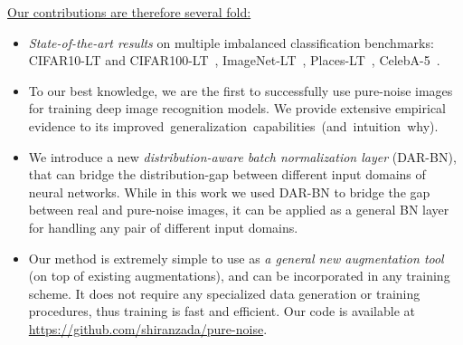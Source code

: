 \documentclass[nohyperref]{article}
\theoremstyle{plain}
\theoremstyle{definition}
\theoremstyle{remark}
\begin{document}
\noindent \underline{Our contributions are therefore several fold:}
\vspace{-0.1cm}
\begin{itemize}[topsep=0pt,itemsep=-1ex,partopsep=1ex,parsep=1ex,leftmargin=*]
\item \emph{State-of-the-art results} on multiple imbalanced classification benchmarks: CIFAR10-LT and CIFAR100-LT~\cite{cao2019learning}, ImageNet-LT~\cite{liu2019large}, Places-LT~\cite{liu2019large}, CelebA-5~\cite{kim2020m2m}.
\item To our best knowledge, we are the first to successfully use pure-noise images for training deep image recognition models. We provide extensive empirical evidence to its \mbox{improved generalization capabilities (and intuition why).}
\item We introduce a new \emph{distribution-aware batch normalization layer} (DAR-BN), that can bridge the distribution-gap between different input domains of neural networks. While in this work we used DAR-BN to bridge the gap between real and pure-noise images, it can be applied as a general BN layer for handling any pair of different input domains.
\item Our method is extremely simple to use as \emph{a general new augmentation tool} (on top of existing augmentations), and can be incorporated in any training scheme. It does not require any specialized data generation or training procedures, thus training is fast and efficient. 
Our code  is available at \hyperlink{https://github.com/shiranzada/pure-noise}{https://github.com/shiranzada/pure-noise}.
\end{itemize}
 
\vspace{-0.15cm}
\end{document}
